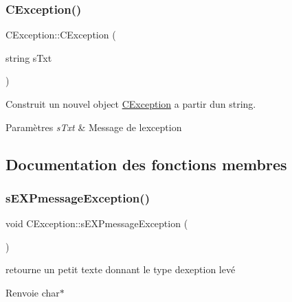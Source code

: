\subsubsection{\texorpdfstring{C\+Exception()}{CException()}\hspace{0.1cm}{\footnotesize\ttfamily [3/3]}}
{\footnotesize\ttfamily C\+Exception\+::\+C\+Exception (\begin{DoxyParamCaption}\item[{string}]{s\+Txt }\end{DoxyParamCaption})}



Construit un nouvel object \hyperlink{classCException}{C\+Exception} a partir d\textquotesingle{}un string. 


\begin{DoxyParams}{Paramètres}
{\em s\+Txt} & Message de l\textquotesingle{}exception \\
\hline
\end{DoxyParams}


\subsection{Documentation des fonctions membres}
\mbox{\label{classCException_a7b5dd75546b7c7bf13206633c8237336}} 
\subsubsection{\texorpdfstring{s\+E\+X\+Pmessage\+Exception()}{sEXPmessageException()}}
{\footnotesize\ttfamily void C\+Exception\+::s\+E\+X\+Pmessage\+Exception (\begin{DoxyParamCaption}{ }\end{DoxyParamCaption})}



retourne un petit texte donnant le type d\textquotesingle{}exeption levé 

\begin{DoxyReturn}{Renvoie}
char$\ast$ 
\end{DoxyReturn}
\mbox{\label{classCException_a916fc87bccf954a5e112967e4f90bb98}} 
